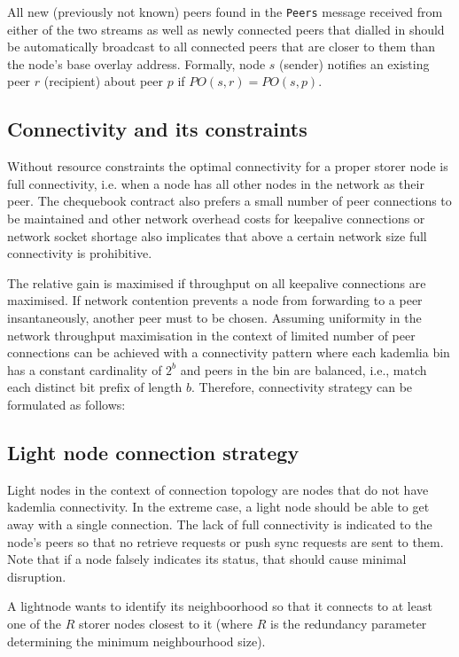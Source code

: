
All new (previously not known) peers found in the \lstinline{Peers} message received from either of the two streams as well as newly connected peers that dialled in should be automatically broadcast to all connected peers that are closer  to them than the node's base overlay address. Formally, 
node $s$ (sender) notifies an existing peer $r$ (recipient) about peer $p$ if $\mathit{PO}(s, r) = \mathit{PO}(s, p)$. 

\subsection{Connectivity and its constraints}

Without resource constraints the optimal connectivity for a proper storer node is full  connectivity, i.e. when a node has all other nodes in the network as their peer. The chequebook contract also prefers a small number of peer connections to be maintained and other network overhead costs for keepalive connections or network socket shortage also implicates that 
above a certain network size full connectivity is prohibitive.

The relative gain is maximised if throughput on all keepalive connections are maximised. If network contention prevents a node from forwarding to a peer insantaneously, another peer must to be chosen. 
Assuming uniformity in the network 
throughput maximisation in the context of limited number of peer connections can be achieved with a connectivity pattern where each kademlia bin has a constant cardinality of $2^b$ and peers in the bin are balanced, i.e., match each distinct bit prefix of length $b$.
Therefore, connectivity strategy can be formulated as follows:







\subsection{Light node connection strategy}

Light nodes in the context of connection topology are nodes that do not have kademlia connectivity. In the extreme case, a light node should be able to get away with a single connection. The lack of full connectivity is indicated to the node's peers so that no retrieve requests or  push sync requests are sent to them. Note that if a node falsely indicates its status, that should cause minimal disruption. 

A lightnode wants to identify its neighboorhood so that it connects to at least one of the $R$ storer nodes closest to it (where $R$ is the redundancy parameter determining the minimum neighbourhood size).



